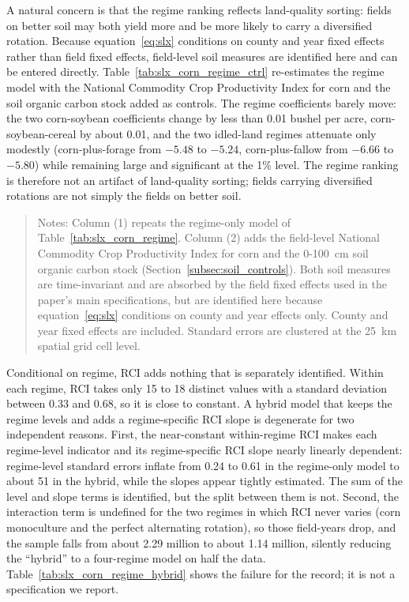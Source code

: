 \documentclass[12pt,letterpaper]{article}
\theoremstyle{remark}
\theoremstyle{remark}
\let\oldtable\table
\let\endoldtable\endtable
\renewenvironment{table}[1][H]{\oldtable[H]}{\endoldtable}
\theoremstyle{plain}
\theoremstyle{definition}
\begin{document}
A natural concern is that the regime ranking reflects land-quality sorting: fields on better soil may both yield more and be more likely to carry a diversified rotation. Because equation~\eqref{eq:slx} conditions on county and year fixed effects rather than field fixed effects, field-level soil measures are identified here and can be entered directly. Table~\ref{tab:slx_corn_regime_ctrl} re-estimates the regime model with the National Commodity Crop Productivity Index for corn and the soil organic carbon stock added as controls. The regime coefficients barely move: the two corn-soybean coefficients change by less than 0.01 bushel per acre, corn-soybean-cereal by about 0.01, and the two idled-land regimes attenuate only modestly (corn-plus-forage from $-5.48$ to $-5.24$, corn-plus-fallow from $-6.66$ to $-5.80$) while remaining large and significant at the 1\% level. The regime ranking is therefore not an artifact of land-quality sorting; fields carrying diversified rotations are not simply the fields on better soil.

\begin{table}[H]
  \centering
  \caption{Regime model with and without land-quality controls.}
  \label{tab:slx_corn_regime_ctrl}
  
\end{table}
\begin{quote}
\small
Notes: Column (1) repeats the regime-only model of
Table~\ref{tab:slx_corn_regime}. Column (2) adds the field-level National
Commodity Crop Productivity Index for corn and the 0-100\, cm soil organic carbon
stock (Section~\ref{subsec:soil_controls}). Both soil measures are time-invariant
and are absorbed by the field fixed effects used in the paper's main
specifications, but are identified here because equation~\eqref{eq:slx}
conditions on county and year effects only. County and year fixed effects are 
included. Standard errors are clustered at the 25\, km spatial grid cell level.
\end{quote}

Conditional on regime, RCI adds nothing that is separately identified. Within each regime, RCI takes only 15 to 18 distinct values with a standard deviation between 0.33 and 0.68, so it is close to constant. A hybrid model that keeps the regime levels and adds a regime-specific RCI slope is degenerate for two independent reasons. First, the near-constant within-regime RCI makes each regime-level indicator and its regime-specific RCI slope nearly linearly dependent: regime-level standard errors inflate from 0.24 to 0.61 in the regime-only model to about 51 in the hybrid, while the slopes appear tightly estimated. The sum of the level and slope terms is identified, but the split between them is not. Second, the interaction term is undefined for the two regimes in which RCI never varies (corn monoculture and the perfect alternating rotation), so those field-years drop, and the sample falls from about 2.29 million to about 1.14 million, silently reducing the ``hybrid'' to a four-regime model on half the data. Table~\ref{tab:slx_corn_regime_hybrid} shows the failure for the record; it is not a specification we report.
\end{document}
